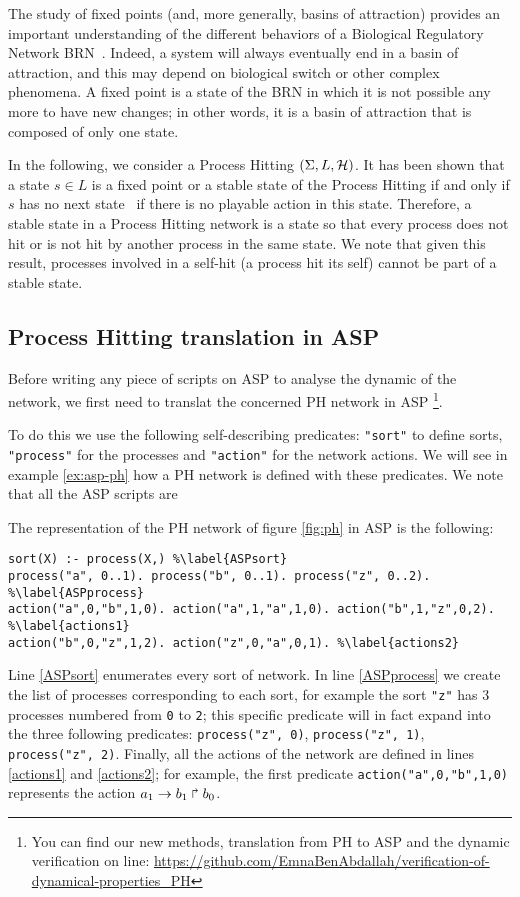 The study of fixed points (and, more generally, basins of attraction) provides an important understanding of the different behaviors of a Biological Regulatory Network BRN~\cite{wuensche1998genomic}.
Indeed, a system will always eventually end in a basin of attraction,
and this may depend on biological switch or other complex phenomena.
A fixed point is a state of the BRN in which it is not possible any more to have new changes;
in other words, it is a basin of attraction that is composed of only one state.

In the following, we consider a Process Hitting $(\Sigma, L, \mathcal{H})$.
It has been shown that a state $s \in L$ is a fixed point or a stable state of the Process Hitting if and only if $s$ has no next state~\cite{PMR10-TCSB} \ie if there is no playable action in this state.
Therefore, a stable state in a Process Hitting network is a state so that
every process does not hit or is not hit by another process in the same state.
We note that given this result, processes involved in a self-hit (a process hit its self) cannot be part of a stable state.

\subsection{Process Hitting translation in ASP}
Before writing any piece of scripts on ASP to analyse the dynamic of the network,
we first need to translat the concerned PH network in ASP  \footnote{You can find our new methods, translation from PH to ASP and the dynamic verification on line: \url{https://github.com/EmnaBenAbdallah/verification-of-dynamical-properties_PH}}.

To do this we use the following self-describing predicates:
\texttt{"sort"} to define sorts, \texttt{"process"} for the processes and \texttt{"action"} for the network actions. We will see in example \ref{ex:asp-ph} how a PH network is defined with these predicates. We note that all the ASP scripts are 


\begin{example}
\label{ex:asp-ph}
The representation of the PH network of figure \ref{fig:ph} in ASP is the following:
\begin{lstlisting}
sort(X) :- process(X,) %\label{ASPsort}
process("a", 0..1). process("b", 0..1). process("z", 0..2). %\label{ASPprocess}
action("a",0,"b",1,0). action("a",1,"a",1,0). action("b",1,"z",0,2). %\label{actions1}
action("b",0,"z",1,2). action("z",0,"a",0,1). %\label{actions2}
\end{lstlisting}
Line \ref{ASPsort} enumerates every sort of network.
In line \ref{ASPprocess} we create the list of processes corresponding to each sort,
for example the sort \texttt{"z"} has 3 processes numbered from \texttt{0} to \texttt{2};
this specific predicate will in fact expand into the three following predicates:
\texttt{process("z", 0)}, \texttt{process("z", 1)}, \texttt{process("z", 2)}.
Finally, all the actions of the network are defined in lines \ref{actions1} and \ref{actions2};
for example, the first predicate \texttt{action("a",0,"b",1,0)} represents the action
$a_1\rightarrow b_1\Rsh b_0$.
\end{example}

